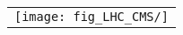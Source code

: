 \begin{figure}[!h]
  \begin{center}
    \begin{tabular}{c}
        \texttt{[image: fig\_LHC\_CMS/]}
    \end{tabular}
    \caption{
            }
    \label{}
  \end{center}
\end{figure}